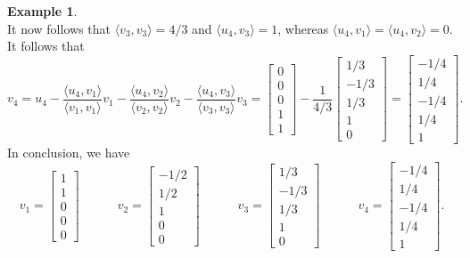 \documentclass{amsart}
\newcommand{\bsm}       {\left[\begin{smallmatrix}}
\newcommand{\esm}       {\end{smallmatrix}\right]}
\newcommand{\ip}[1]     {\langle #1\rangle}
\renewcommand{\:}       {\colon}
\theoremstyle{definition}
\newtheorem{example}[theorem]{Example}
\begin{document}
\begin{example}
\[ \]
 It now follows that $\ip{v_3,v_3}=4/3$ and $\ip{u_4,v_3}=1$,
 whereas $\ip{u_4,v_1}=\ip{u_4,v_2}=0$.  It follows that 
 \[ v_4 = u_4 - \frac{\ip{u_4,v_1}}{\ip{v_1,v_1}} v_1
              - \frac{\ip{u_4,v_2}}{\ip{v_2,v_2}} v_2
              - \frac{\ip{u_4,v_3}}{\ip{v_3,v_3}} v_3
        = \bsm 0\\ 0\\ 0\\ 1\\ 1\esm - 
          \frac{1}{4/3}\bsm 1/3\\-1/3\\1/3\\1\\0 \esm 
        = \bsm -1/4 \\ 1/4 \\ -1/4 \\ 1/4 \\ 1 \esm.
 \]
 In conclusion, we have
 \[ v_1 = \bsm 1\\1\\0\\0\\0 \esm \hspace{3em}
    v_2 = \bsm -1/2\\1/2\\1\\0\\0 \esm \hspace{3em}
    v_3 = \bsm 1/3\\-1/3\\1/3\\1\\0 \esm \hspace{3em}
    v_4 = \bsm -1/4\\1/4\\-1/4\\1/4\\1 \esm.
 \] 
\end{example}
\end{document}
